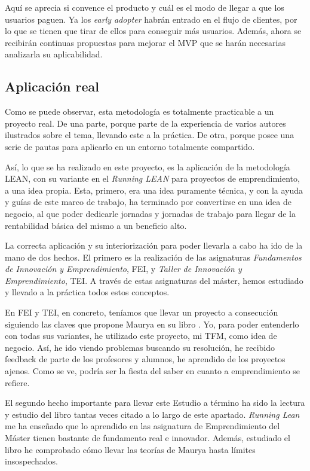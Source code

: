 Aquí se aprecia si convence el producto y cuál es el modo de llegar a que los usuarios paguen. Ya los \textit{early adopter} habrán entrado en el flujo de clientes, por lo que se tienen que tirar de ellos para conseguir más usuarios. Además, ahora se recibirán continuas propuestas para mejorar el MVP que se harán necesarias analizarla su aplicabilidad.

\subsection{Aplicación real}

Como se puede observar, esta metodología es totalmente practicable a un proyecto real. De una parte, porque parte de la experiencia de varios autores ilustrados sobre el tema, llevando este a la práctica. De otra, porque posee una serie de pautas para aplicarlo en un entorno totalmente compartido.

Así, lo que se ha realizado en este proyecto, es la aplicación de la metodología LEAN, con su variante en el \textit{Running LEAN} para proyectos de emprendimiento, a una idea propia. Esta, primero, era una idea puramente técnica, y con la ayuda y guías de este marco de trabajo, ha terminado por convertirse en una idea de negocio, al que poder dedicarle jornadas y jornadas de trabajo para llegar de la rentabilidad básica del mismo a un beneficio alto.

La correcta aplicación y su interiorización para poder llevarla a cabo ha ido de la mano de dos hechos. El primero es la realización de las asignaturas \textit{Fundamentos de Innovación y Emprendimiento}, FEI, y \textit{Taller de Innovación y Emprendimiento}, TEI. A través de estas asignaturas del máster, hemos estudiado y llevado a la práctica todos estos conceptos.

En FEI y TEI, en concreto, teníamos que llevar un proyecto a consecución siguiendo las claves que propone Maurya en su libro . Yo, para poder entenderlo con todas sus variantes, he utilizado este proyecto, mi TFM, como idea de negocio. Así, he ido viendo problemas buscando su resolución, he recibido feedback de parte de los profesores y alumnos, he aprendido de los proyectos ajenos. Como se ve, podría ser la fiesta del saber en cuanto a emprendimiento se refiere.

El segundo hecho importante para llevar este Estudio a término ha sido la lectura y estudio del libro tantas veces citado a lo largo de este apartado. \textit{Running Lean} me ha enseñado que lo aprendido en las asignatura de Emprendimiento del Máster tienen bastante de fundamento real e innovador. Además, estudiado el libro he comprobado cómo llevar las teorías de Maurya hasta límites insospechados.

